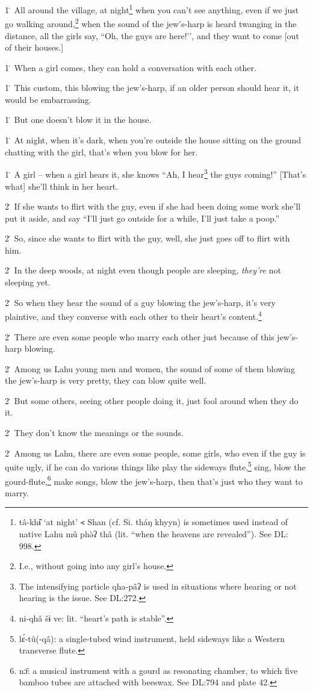 1\. All around the village, at night\footnote{tâ-khɨ̂ `at night' \texttt{<} Shan (cf. Si. tháŋ khyyn) is sometimes used instead of native Lahu mû phə̀ʔ thâ (lit. “when the heavens are revealed”). See DL: 998.} when you can't see anything, even if we just go walking around,\footnote{I.e., without going into any girl's house.} when the sound of the jew's-harp is heard twanging in the distance, all the girls say, ``Oh, the guys are here!’’, and they want to come [out of their houses.]

1\. When a girl comes, they can hold a conversation with each other.

1\. This custom, this blowing the jew's-harp, if an older person should hear it, it would be embarrassing.

1\. But one doesn't blow it in the house.

1\. At night, when it's dark, when you're outside the house sitting on the ground
chatting with the girl, that's when you blow for her.

1\. A girl -- when a girl hears it, she knows ``Ah, I hear\footnote{The intensifying particle qha-pâʔ is used in situations where hearing or not hearing is the issue. See DL:272.} the guys coming!'' [That's what] she'll think in her heart.

2\. If she wants to flirt with the guy, even if she had been doing some work she'll put it aside, and say ``I'll just go outside for a while, I'll just take a poop.''

2\. So, since she wants to flirt with the guy, well, she just goes off to flirt with him.

2\. In the deep woods, at night even though people are sleeping, \textit{they're} not sleeping yet.

2\. So when they hear the sound of a guy blowing the jew's-harp, it's very plaintive, and they converse with each other to their heart's content.\footnote{ni-qhâ šɨ ve: lit. ``heart's path is stable''.}

2\. There are even some people who marry each other just because of this jew's-harp blowing.

2\. Among us Lahu young men and women, the sound of some of them blowing the jew's-harp is very pretty, they can blow quite well.

2\. But some others, seeing other people doing it, just fool around when they do it.

2\. They don't know the meanings or the sounds.

2\. Among us Lahu, there are even some people, some girls, who even if the guy is quite ugly, if he can do various things like play the sideways flute,\footnote{lɛ́-tû(-qâ): a single-tubed wind instrument, held sideways like a Western transverse flute.} sing, blow the gourd-flute,\footnote{nɔ̄: a musical instrument with a gourd as resonating chamber, to which five bamboo tubes are attached with beeswax. See DL:794 and plate 42.} make songs, blow the jew's-harp, then that's just who they want to marry.

